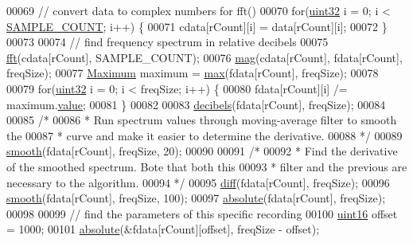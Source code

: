 \begin{DoxyCode}
00069             \textcolor{comment}{// convert data to complex numbers for fft()}
00070             \textcolor{keywordflow}{for}(\hyperlink{definitions_8hpp_a1134b580f8da4de94ca6b1de4d37975e}{uint32} i = 0; i < \hyperlink{definitions_8hpp_a1682c770d91c5d167b621a782be940d4}{SAMPLE\_COUNT}; i++) \{
00071                 cdata[rCount][i] = data[rCount][i];
00072             \}
00073 
00074             \textcolor{comment}{// find frequency spectrum in relative decibels}
00075             \hyperlink{namespacevaso_af74f08a8afd7967b6c2b3c2b0e5fb1e9}{fft}(cdata[rCount], SAMPLE\_COUNT);
00076             \hyperlink{namespacevaso_a5d355b5c326a852e2ce95c258450898c}{mag}(cdata[rCount], fdata[rCount], freqSize);
00077             \hyperlink{structMaximum}{Maximum} maximum = \hyperlink{namespacevaso_a122846d728be312454a452d379915e10}{max}(fdata[rCount], freqSize);
00078 
00079             \textcolor{keywordflow}{for}(\hyperlink{definitions_8hpp_a1134b580f8da4de94ca6b1de4d37975e}{uint32} i = 0; i < freqSize; i++) \{
00080                 fdata[rCount][i] /= maximum.\hyperlink{structMaximum_aa7e84cbf37b694670142670014366969}{value};
00081             \}
00082 
00083             \hyperlink{namespacevaso_af9bb2211cf3478333dfc1873bf316263}{decibels}(fdata[rCount], freqSize);
00084             
00085             \textcolor{comment}{/*}
00086 \textcolor{comment}{             * Run spectrum values through moving-average filter to smooth the}
00087 \textcolor{comment}{             * curve and make it easier to determine the derivative.}
00088 \textcolor{comment}{             */}
00089             \hyperlink{namespacevaso_a5b7fc1a58199e2cac989f417a9faa1ce}{smooth}(fdata[rCount], freqSize, 20);
00090 
00091             \textcolor{comment}{/*}
00092 \textcolor{comment}{             * Find the derivative of the smoothed spectrum. Bote that both this}
00093 \textcolor{comment}{             * filter and the previous are necessary to the algorithm.}
00094 \textcolor{comment}{             */}
00095             \hyperlink{namespacevaso_a7d108bce812e906d8b1810815774c7ea}{diff}(fdata[rCount], freqSize);
00096             \hyperlink{namespacevaso_a5b7fc1a58199e2cac989f417a9faa1ce}{smooth}(fdata[rCount], freqSize, 100);
00097             \hyperlink{namespacevaso_a6ca90add966ce1773fc59a6883e6cd0c}{absolute}(fdata[rCount], freqSize);
00098 
00099             \textcolor{comment}{// find the parameters of this specific recording}
00100             \hyperlink{definitions_8hpp_a05f6b0ae8f6a6e135b0e290c25fe0e4e}{uint16} offset = 1000;
00101             \hyperlink{namespacevaso_a6ca90add966ce1773fc59a6883e6cd0c}{absolute}(&fdata[rCount][offset],    freqSize - offset);

\end{DoxyCode}
